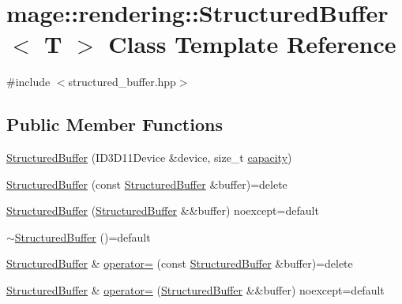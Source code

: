 \hypertarget{classmage_1_1rendering_1_1_structured_buffer}{}\section{mage\+:\+:rendering\+:\+:Structured\+Buffer$<$ T $>$ Class Template Reference}
\label{classmage_1_1rendering_1_1_structured_buffer}


{\ttfamily \#include $<$structured\+\_\+buffer.\+hpp$>$}

\subsection*{Public Member Functions}
\begin{DoxyCompactItemize}
\item 
\mbox{\hyperlink{classmage_1_1rendering_1_1_structured_buffer_a9a8b0c65fb342896dd9e123e59db5526}{Structured\+Buffer}} (I\+D3\+D11\+Device \&device, size\+\_\+t \mbox{\hyperlink{classmage_1_1rendering_1_1_structured_buffer_aa7b9ec40ba586d8f4a063926d4924b70}{capacity}})
\item 
\mbox{\hyperlink{classmage_1_1rendering_1_1_structured_buffer_a7b36af7d270cf05865e498d0d2e0ca5e}{Structured\+Buffer}} (const \mbox{\hyperlink{classmage_1_1rendering_1_1_structured_buffer}{Structured\+Buffer}} \&buffer)=delete
\item 
\mbox{\hyperlink{classmage_1_1rendering_1_1_structured_buffer_a61c5c9f1a734f9c791a56c1c4819588e}{Structured\+Buffer}} (\mbox{\hyperlink{classmage_1_1rendering_1_1_structured_buffer}{Structured\+Buffer}} \&\&buffer) noexcept=default
\item 
\mbox{\hyperlink{classmage_1_1rendering_1_1_structured_buffer_abedc0f11782f0a321341a501267bb546}{$\sim$\+Structured\+Buffer}} ()=default
\item 
\mbox{\hyperlink{classmage_1_1rendering_1_1_structured_buffer}{Structured\+Buffer}} \& \mbox{\hyperlink{classmage_1_1rendering_1_1_structured_buffer_a646a5540b88c4a4262b4c6649934c368}{operator=}} (const \mbox{\hyperlink{classmage_1_1rendering_1_1_structured_buffer}{Structured\+Buffer}} \&buffer)=delete
\item 
\mbox{\hyperlink{classmage_1_1rendering_1_1_structured_buffer}{Structured\+Buffer}} \& \mbox{\hyperlink{classmage_1_1rendering_1_1_structured_buffer_ad5ac95b375a2ca537abd61706746bb58}{operator=}} (\mbox{\hyperlink{classmage_1_1rendering_1_1_structured_buffer}{Structured\+Buffer}} \&\&buffer) noexcept=default

\end{DoxyCompactItemize}
